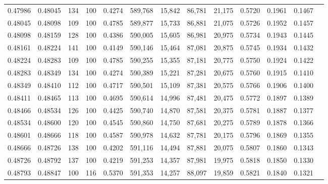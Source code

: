 \begin{tabular}{rrrrrrrrrrrrr}
0.47986 & 0.48045 &   134 & 100 &                                     0.4274 & 589,768 &  15,842 &  86,781 &  21,175 & 0.5720 & 0.1961 & 0.1467 \\
0.48045 & 0.48098 &   109 & 100 &                                     0.4785 & 589,877 &  15,733 &  86,881 &  21,075 & 0.5726 & 0.1952 & 0.1457 \\
0.48098 & 0.48159 &   128 & 100 &                                     0.4386 & 590,005 &  15,605 &  86,981 &  20,975 & 0.5734 & 0.1943 & 0.1445 \\
0.48161 & 0.48224 &   141 & 100 &                                     0.4149 & 590,146 &  15,464 &  87,081 &  20,875 & 0.5745 & 0.1934 & 0.1432 \\
0.48224 & 0.48283 &   109 & 100 &                                     0.4785 & 590,255 &  15,355 &  87,181 &  20,775 & 0.5750 & 0.1924 & 0.1422 \\
0.48283 & 0.48349 &   134 & 100 &                                     0.4274 & 590,389 &  15,221 &  87,281 &  20,675 & 0.5760 & 0.1915 & 0.1410 \\
0.48349 & 0.48410 &   112 & 100 &                                     0.4717 & 590,501 &  15,109 &  87,381 &  20,575 & 0.5766 & 0.1906 & 0.1400 \\
0.48411 & 0.48465 &   113 & 100 &                                     0.4695 & 590,614 &  14,996 &  87,481 &  20,475 & 0.5772 & 0.1897 & 0.1389 \\
0.48466 & 0.48534 &   126 & 100 &                                     0.4425 & 590,740 &  14,870 &  87,581 &  20,375 & 0.5781 & 0.1887 & 0.1377 \\
0.48534 & 0.48600 &   120 & 100 &                                     0.4545 & 590,860 &  14,750 &  87,681 &  20,275 & 0.5789 & 0.1878 & 0.1366 \\
0.48601 & 0.48666 &   118 & 100 &                                     0.4587 & 590,978 &  14,632 &  87,781 &  20,175 & 0.5796 & 0.1869 & 0.1355 \\
0.48666 & 0.48726 &   138 & 100 &                                     0.4202 & 591,116 &  14,494 &  87,881 &  20,075 & 0.5807 & 0.1860 & 0.1343 \\
0.48726 & 0.48792 &   137 & 100 &                                     0.4219 & 591,253 &  14,357 &  87,981 &  19,975 & 0.5818 & 0.1850 & 0.1330 \\
0.48793 & 0.48847 &   100 & 116 &                                     0.5370 & 591,353 &  14,257 &  88,097 &  19,859 & 0.5821 & 0.1840 & 0.1321 \\

\end{tabular}
